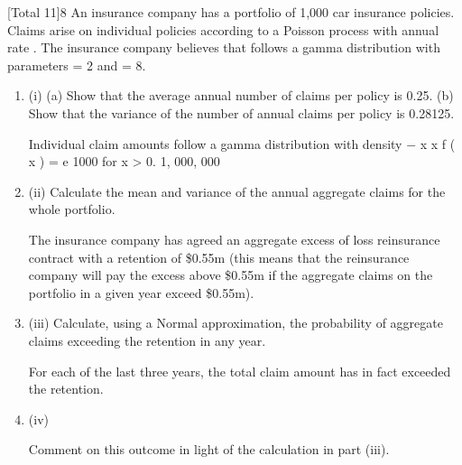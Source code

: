 \documentclass[a4paper,12pt]{article}
\begin{document}
[Total 11]8
An insurance company has a portfolio of 1,000 car insurance policies. Claims arise
on individual policies according to a Poisson process with annual rate \mu  . The
insurance company believes that \mu  follows a gamma distribution with parameters
\alpha = 2 and \lambda = 8.
\begin{enumerate}
\item (i)
(a) Show that the average annual number of claims per policy is 0.25.
(b) Show that the variance of the number of annual claims per policy is
0.28125.

Individual claim amounts follow a gamma distribution with density
− x
x
f ( x ) =
e 1000 for x > 0.
1, 000, 000
\item (ii)
Calculate the mean and variance of the annual aggregate claims for the whole
portfolio.

The insurance company has agreed an aggregate excess of loss reinsurance contract
with a retention of \$0.55m (this means that the reinsurance company will pay the
excess above \$0.55m if the aggregate claims on the portfolio in a given year exceed
\$0.55m).
\item (iii)
Calculate, using a Normal approximation, the probability of aggregate claims
exceeding the retention in any year.

For each of the last three years, the total claim amount has in fact exceeded the
retention.
\item (iv)

Comment on this outcome in light of the calculation in part (iii).
\end{enumerate}

\newpage
\end{document}
